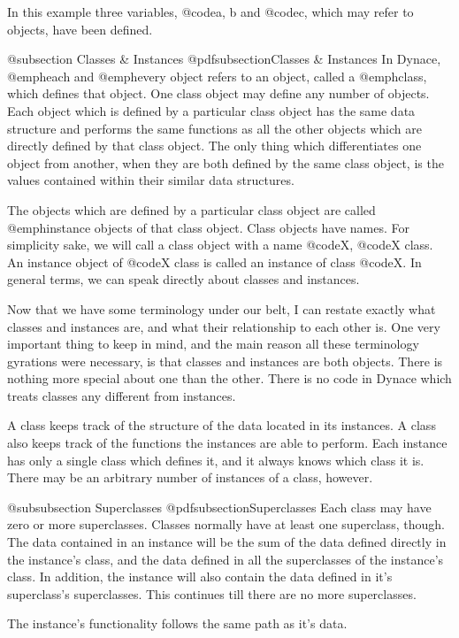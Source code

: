 In this example three variables, @code{a, b} and @code{c}, which may
refer to objects, have been defined.

@subsection Classes & Instances
@pdfsubsection{Classes & Instances}
In Dynace, @emph{each} and @emph{every} object refers to an object, called
a @emph{class}, which defines that object.  One class object may define
any number of objects.  Each object which is defined by a particular
class object has the same data structure and performs the same functions
as all the other objects which are directly defined by that class
object.  The only thing which differentiates one object from another,
when they are both defined by the same class object, is the values
contained within their similar data structures.

The objects which are defined by a particular class object are called
@emph{instance} objects of that class object.  Class objects have names. 
For simplicity sake, we will call a class object with a name @code{X},
@code{X} class.  An instance object of @code{X} class is called an
instance of class @code{X}.  In general terms, we can speak directly
about classes and instances.

Now that we have some terminology under our belt, I can restate exactly
what classes and instances are, and what their relationship to each
other is.  One very important thing to keep in mind, and the main reason 
all these terminology gyrations were necessary, is that classes and instances
are both objects.  There is nothing more special about one than the other.
There is no code in Dynace which treats classes any different from instances.

A class keeps track of the structure of the data located in its instances.
A class also keeps track of the functions the instances are able to perform.
Each instance has only a single class which defines it, and it always
knows which class it is.  There may be an arbitrary number of instances of
a class, however.

@subsubsection  Superclasses
@pdfsubsection{Superclasses}
Each class may have zero or more superclasses.  Classes normally have at
least one superclass, though.  The data contained in an instance will
be the sum of the data defined directly in the instance's class, and the
data defined in all the superclasses of the instance's class.  In
addition, the instance will also contain the data defined in it's
superclass's superclasses.  This continues till there are no more
superclasses.

The instance's functionality follows the same path as it's data.

